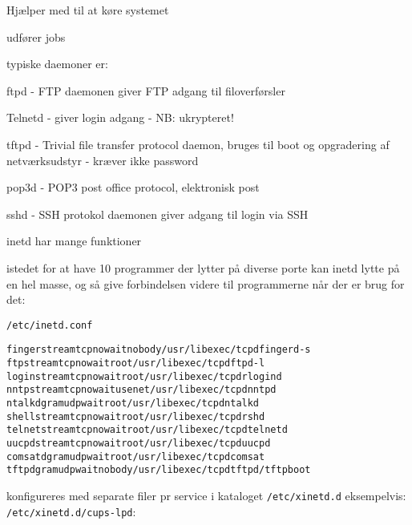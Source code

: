 
\begin{list1}
\item Hjælper med til at køre systemet
\item udfører jobs
\item typiske daemoner er:
  \begin{list2}
  \item ftpd - FTP daemonen giver FTP adgang til filoverførsler
\item Telnetd - giver login adgang - NB: ukrypteret!
\item tftpd - Trivial file transfer protocol daemon, bruges til boot
  og opgradering af netværksudstyr - kræver ikke password
\item pop3d - POP3 post office protocol, elektronisk post
\item sshd - SSH protokol daemonen giver adgang til login via SSH
  \end{list2}
\end{list1}


\begin{list1}
  \item inetd har mange funktioner
\item istedet for at have 10 programmer der lytter på diverse porte
  kan inetd lytte på en hel masse, og så give forbindelsen videre til
  programmerne når der er brug for det:
\item \verb+/etc/inetd.conf+
\end{list1}

\begin{alltt}
\small
finger stream  tcp     nowait  nobody  /usr/libexec/tcpd fingerd -s
ftp    stream  tcp     nowait  root    /usr/libexec/tcpd ftpd -l
login  stream  tcp     nowait  root    /usr/libexec/tcpd rlogind
nntp   stream  tcp     nowait  usenet  /usr/libexec/tcpd nntpd
ntalk  dgram   udp     wait    root    /usr/libexec/tcpd ntalkd
shell  stream  tcp     nowait  root    /usr/libexec/tcpd rshd
telnet stream  tcp     nowait  root    /usr/libexec/tcpd telnetd
uucpd  stream  tcp     nowait  root    /usr/libexec/tcpd uucpd
comsat dgram   udp     wait    root    /usr/libexec/tcpd comsat
tftp   dgram   udp     wait    nobody  /usr/libexec/tcpd tftpd /tftpboot
\end{alltt}


\begin{list1}
\item konfigureres med separate filer pr service i kataloget
\verb+/etc/xinetd.d+ eksempelvis: \verb+/etc/xinetd.d/cups-lpd+:
\end{list1}

